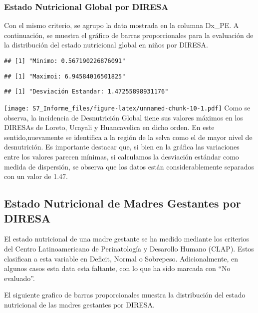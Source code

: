 \documentclass[
]{article}
\begin{document}
\hypertarget{estado-nutricional-global-por-diresa}{%
\subsubsection{Estado Nutricional Global por
DIRESA}\label{estado-nutricional-global-por-diresa}}

Con el mismo criterio, se agrupo la data mostrada en la columna Dx\_PE.
A continuación, se muestra el gráfico de barras proporcionales para la
evaluación de la distribución del estado nutricional global en niños por
DIRESA.

\begin{verbatim}
## [1] "Minimo: 0.567190226876091"
\end{verbatim}

\begin{verbatim}
## [1] "Maximoi: 6.94584016501825"
\end{verbatim}

\begin{verbatim}
## [1] "Desviación Estandar: 1.47255898931176"
\end{verbatim}

\texttt{[image: S7\_Informe\_files/figure-latex/unnamed-chunk-10-1.pdf]}
Como se observa, la incidencia de Desnutrición Global tiene sus valores
máximos en los DIRESAs de Loreto, Ucayali y Huancavelica en dicho orden.
En este sentido,nuevamente se identifica a la región de la selva como el
de mayor nivel de desnutrición. Es importante destacar que, si bien en
la gráfica las variaciones entre los valores parecen mínimas, si
calculamos la desviación estándar como medida de dispersión, se observa
que los datos están considerablemente separados con un valor de 1.47.

\hypertarget{estado-nutricional-de-madres-gestantes-por-diresa}{%
\subsection{Estado Nutricional de Madres Gestantes por
DIRESA}\label{estado-nutricional-de-madres-gestantes-por-diresa}}

El estado nutricional de una madre gestante se ha medido mediante los
criterios del Centro Latinoamericano de Perinatología y Desarollo Humano
(CLAP). Estos clasifican a esta variable en Deficit, Normal o Sobrepeso.
Adicionalmente, en algunos casos esta data esta faltante, con lo que ha
sido marcada con ``No evaluado''.

El siguiente grafico de barras proporcionales muestra la distribución
del estado nutricional de las madres gestantes por DIRESA.
\end{document}
